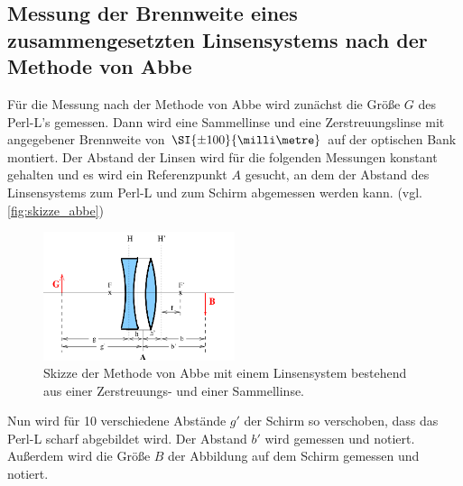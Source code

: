 \subsection{Messung der Brennweite eines zusammengesetzten Linsensystems nach der Methode von Abbe}
\label{ssec:Durchführung_abbe}

Für die Messung nach der Methode von Abbe wird zunächst die Größe $G$ des Perl-L's gemessen.
Dann wird eine Sammellinse und eine Zerstreuungslinse mit angegebener Brennweite von $\SI{\pm 100}{\milli\metre}$ auf der optischen Bank montiert.
Der Abstand der Linsen wird für die folgenden Messungen konstant gehalten und es wird ein Referenzpunkt $A$ gesucht, an dem der Abstand des Linsensystems zum Perl-L und zum Schirm abgemessen werden kann. (vgl. \autoref{fig:skizze_abbe})

\begin{figure}
    \centering
    \includegraphics[width=0.5\textwidth]{images/skizze_abbe.png}
    \caption{Skizze der Methode von Abbe mit einem Linsensystem bestehend aus einer Zerstreuungs- und einer Sammellinse. \cite{V408}}
    \label{fig:skizze_abbe}
\end{figure}

Nun wird für 10 verschiedene Abstände $g'$ der Schirm so verschoben, dass das Perl-L scharf abgebildet wird.
Der Abstand $b'$ wird gemessen und notiert.
Außerdem wird die Größe $B$ der Abbildung auf dem Schirm gemessen und notiert.


